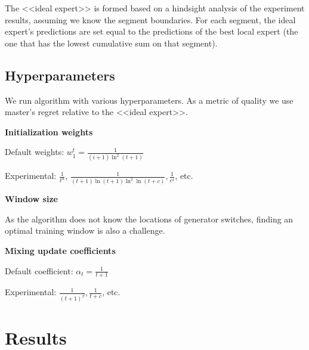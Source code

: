 \documentclass[12pt, twoside]{article}
\begin{document}
The <<ideal expert>> is formed based on a hindsight analysis of the experiment results, assuming we know the segment boundaries. For each segment, the ideal expert's predictions are set equal to the predictions of the best local expert (the one that has the lowest cumulative sum on that segment).
\newpage
\subsection{Hyperparameters}
We run algorithm with various hyperparameters. As a metric of quality we use master's regret relative to the <<ideal expert>>.

\textbf{Initialization weights}

\hspace*{3mm} Default weights: $w_1^t= \frac{1}{(i+1)\ln^2(t+1)}$

\hspace*{3mm} Experimental: $\frac{1}{t^\alpha}$, $\frac{1}{(t+1)\ln(t+1)\ln^2\ln(t+c)}, \frac{1}{e^t}$, etc.

\textbf{Window size}

\hspace*{3mm} As the algorithm does not know the locations of generator switches, finding an optimal training window is also a challenge.

\textbf{Mixing update coefficients}

\hspace*{3mm} Default coefficient: $\alpha_t = \frac{1}{t+1}$

\hspace*{3mm} Experimental:  $\frac{1}{(t+1)^\beta}, \frac{1}{t+c}$, etc.

\section{Results}
\end{document}
